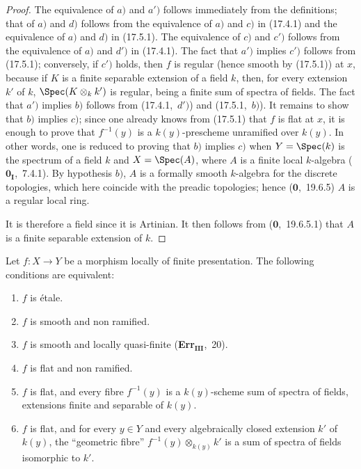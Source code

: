 \begin{proof}
The equivalence of $a)$ and $a')$ follows immediately from the definitions; that of $a)$ and $d)$ follows from the equivalence of $a)$ and $c)$ in (17.4.1) and the equivalence of $a)$ and $d)$ in (17.5.1).
The equivalence of $c)$ and $c')$ follows from the equivalence of $a)$ and $d')$ in (17.4.1).
The fact that $a')$ implies $c')$ follows from (17.5.1); conversely, if $c')$ holds, then $f$ is regular (hence smooth by (17.5.1)) at $x$, because if $K$ is a finite separable extension of a field $k$, then, for every extension $k'$ of $k$, $\Spec(K\otimes_k k')$ is regular, being a finite sum of spectra of fields.
The fact that $a')$ implies $b)$ follows from (17.4.1,~$d')$) and (17.5.1,~$b)$).
It remains to show that $b)$ implies $c)$; since one already knows from (17.5.1) that $f$ is flat at $x$, it is enough to prove that $f^{-1}(y)$ is a $k(y)$-prescheme unramified over $k(y)$.
In other words, one is reduced to proving that $b)$ implies $c)$ when $Y=\Spec(k)$ is the spectrum of a field $k$ and $X=\Spec(A)$, where $A$ is a finite local $k$-algebra ($\mathbf{0}_\mathbf{I}$,~7.4.1).
By hypothesis $b)$, $A$ is a formally smooth $k$-algebra for the discrete topologies, which here coincide with the preadic topologies; hence ($\mathbf{0}$,~19.6.5) $A$ is a regular local ring.


It is therefore a field since it is Artinian.
It then follows from ($\mathbf{0}$,~19.6.5.1) that $A$ is a finite separable extension of $k$.
\end{proof}

\begin{corollary}[17.6.2]
\label{IV.17.6.2}
Let $f:X\to Y$ be a morphism locally of finite presentation.
The following conditions are equivalent:
\begin{enumerate}[label=(\alph*)]
  \item[a)] $f$ is \'etale.
  \item[a')] $f$ is smooth and non ramified.
  \item[b)] $f$ is smooth and locally quasi-finite (\textbf{Err}$_\textbf{III}$,~20).
  \item[c)] $f$ is flat and non ramified.
  \item[c')] $f$ is flat, and every fibre $f^{-1}(y)$ is a $k(y)$-scheme sum of spectra of fields, extensions finite and separable of $k(y)$.
  \item[c'')] $f$ is flat, and for every $y\in Y$ and every algebraically closed extension $k'$ of $k(y)$, the ``geometric fibre'' $f^{-1}(y)\otimes_{k(y)}k'$ is a sum of spectra of fields isomorphic to $k'$.
\end{enumerate}
\end{corollary}

